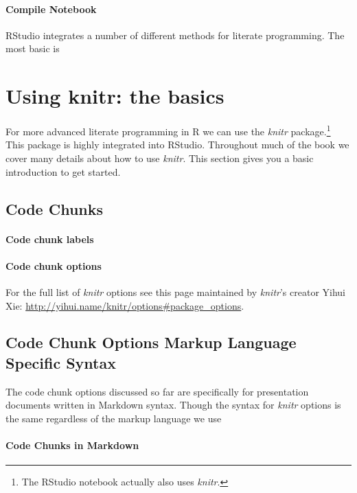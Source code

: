\documentclass[ChapterTOCs,krantz1]{krantz}\usepackage{graphicx, color}
\begin{document}
\paragraph{Compile Notebook}

RStudio integrates a number of different methods for literate programming. The most basic is 

\section{Using knitr: the basics}

For more advanced literate programming in R we can use the {\emph{knitr}} package.\footnote{The RStudio notebook actually also uses {\emph{knitr}}.} This package is highly integrated into RStudio. Throughout much of the book we cover many details about how to use {\emph{knitr}}. This section gives you a basic introduction to get started.

\subsection{Code Chunks}

\paragraph{Code chunk labels}

\paragraph{Code chunk options}

For the full list of {\emph{knitr}} options see this page maintained by {\emph{knitr}}'s creator Yihui Xie: \url{http://yihui.name/knitr/options#package_options}.

\subsection{Code Chunk Options Markup Language Specific Syntax}

The code chunk options discussed so far are specifically for presentation documents written in Markdown syntax. Though the syntax for {\emph{knitr}} options is the same regardless of the markup language we use 

\paragraph{Code Chunks in Markdown}
\end{document}
